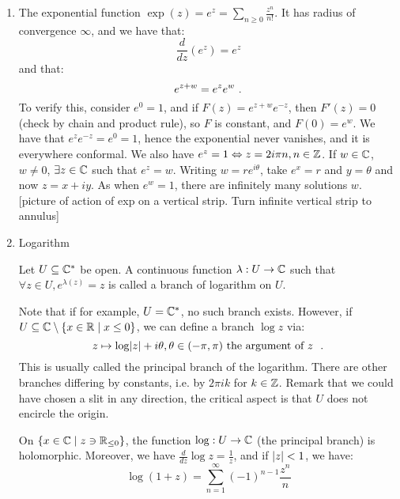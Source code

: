 \begin{enumerate}
\item The exponential function $\exp(z) = e^z = \sum_{n \geq 0} \frac{z^n}{n!}$. It has radius of convergence $\infty$, and we have that:
\[
\frac{d}{dz} (e^z) = e^z
\]
and that:
\[
e^{z+w} = e^ze^w \ \text{.}
\]
To verify this, consider $e^0 = 1$, and if $F(z) = e^{z+w}e^{-z}$, then $F'(z) = 0$ (check by chain and product rule), so $F$ is constant, and $F(0) = e^w$. 
We have that $e^ze^{-z} = e^0 = 1$, hence the exponential never vanishes, and it is everywhere conformal.
We also have $e^z = 1 \Leftrightarrow z = 2i\pi{}n, n \in \mathbb{Z}$. 
If $w \in \mathbb{C}$, $w \neq 0$, $\exists z \in \mathbb{C}$ such that $e^z = w$. Writing $w = re^{i\theta}$, take $e^x = r$ and $y = \theta$ and now $z = x + iy$. As when $e^w = 1$, there are infinitely many solutions $w$.
[picture of action of exp on a vertical strip. Turn infinite vertical strip to annulus]

\item Logarithm
  \begin{definition}
    Let $U \subseteq \mathbb{C}^*$ be open. A continuous function $\lambda : U \rightarrow \mathbb{C}$ such that $\forall z \in U, e^{\lambda(z)} = z$ is called a branch of logarithm on $U$. 
  \end{definition}
  Note that if for example, $U = \mathbb{C}^*$, no such branch exists. However, if $U \subseteq \mathbb{C} \setminus \{x \in \mathbb{R} \mid x \leq 0\}$, we can define a branch $\log z$ via:
\[
z \mapsto \log \lvert z\rvert + i\theta, \theta \in (-\pi, \pi) \text{ the argument of $z$ }\ \text{.}
\]
This is usually called the principal branch of the logarithm. There are other branches differing by constants, i.e. by $2\pi{}ik$ for $k \in \mathbb{Z}$.
Remark that we could have chosen a slit in any direction, the critical aspect is that $U$ does not encircle the origin.

\begin{proposition}
  On $\{ x \in \mathbb{C} \mid z \ni \mathbb{R}_{\leq 0} \}$, the function $\log : U \rightarrow \mathbb{C}$ (the principal branch) is holomorphic. Moreover, we have $\frac{d}{dz} \log z = \frac{1}{z}$, and if $\lvert z\rvert < 1$, we have:
\[
\log (1 + z) = \sum_{n = 1}^\infty (-1)^{n-1}\frac{z^n}{n}
\]
\end{proposition}
\end{enumerate}


